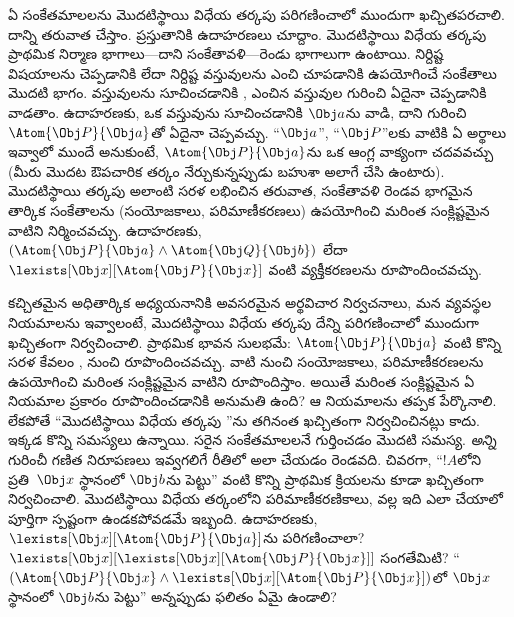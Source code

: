 \documentclass[../../../include/open-logic-section]{subfiles}
\begin{document}


ఏ సంకేతమాలలను మొదటిస్థాయి విధేయ తర్కపు  పరిగణించాలో ముందుగా
ఖచ్చితపరచాలి. దాన్ని తరువాత చేస్తాం. ప్రస్తుతానికి ఉదాహరణలు చూద్దాం. మొదటిస్థాయి విధేయ తర్కపు ప్రాథమిక నిర్మాణ భాగాలు---దాని
సంకేతావళి---రెండు భాగాలుగా ఉంటాయి. నిర్దిష్ట విషయాలను
చెప్పడానికి లేదా నిర్దిష్ట వస్తువులను ఎంచి చూపడానికి ఉపయోగించే
సంకేతాలు మొదటి భాగం. వస్తువులను సూచించడానికి ,
ఎంచిన వస్తువుల గురించి ఏదైనా చెప్పడానికి  వాడతాం.
ఉదాహరణకు, ఒక వస్తువును సూచించడానికి $\Obj a$ను 
వాడి, దాని గురించి
~$\Atom{\Obj P}{\Obj a}$తో ఏదైనా చెప్పవచ్చు. ``$\Obj
a$'', ``$\Obj P$''లకు వాటికి ఏ అర్థాలు ఇవ్వాలో ముందే అనుకుంటే,
$\Atom{\Obj P}{\Obj a}$ను ఒక ఆంగ్ల వాక్యంగా చదవవచ్చు (మీరు మొదట
ఔపచారిక తర్కం నేర్చుకున్నప్పుడు బహుశా అలాగే చేసి ఉంటారు). మొదటిస్థాయి
తర్కపు అలాంటి సరళ  లభించిన తరువాత, సంకేతావళి రెండవ
భాగమైన తార్కిక సంకేతాలను (సంయోజకాలు, పరిమాణీకరణలు) ఉపయోగించి
మరింత సంక్లిష్టమైన వాటిని నిర్మించవచ్చు. ఉదాహరణకు,
$(\Atom{\Obj P}{\Obj a} \land \Atom{\Obj Q}{\Obj b})$ లేదా
$\lexists[\Obj x][\Atom{\Obj P}{\Obj x}]$ వంటి వ్యక్తీకరణలను
రూపొందించవచ్చు.

కచ్చితమైన అధితార్కిక అధ్యయనానికి అవసరమైన అర్థవిచార నిర్వచనాలు,
మన  వ్యవస్థల నియమాలను ఇవ్వాలంటే, మొదటిస్థాయి విధేయ తర్కపు
 దేన్ని పరిగణించాలో ముందుగా ఖచ్చితంగా నిర్వచించాలి.
ప్రాథమిక భావన సులభమే: $\Atom{\Obj P}{\Obj a}$ వంటి కొన్ని సరళ
 కేవలం ,  నుంచి
రూపొందించవచ్చు. వాటి నుంచి సంయోజకాలు, పరిమాణీకరణలను ఉపయోగించి
మరింత సంక్లిష్టమైన వాటిని రూపొందిస్తాం. అయితే మరింత సంక్లిష్టమైన
 ఏ నియమాల ప్రకారం రూపొందించడానికి అనుమతి ఉంది?
ఆ నియమాలను తప్పక పేర్కొనాలి. లేకపోతే ``మొదటిస్థాయి విధేయ తర్కపు
''ను తగినంత ఖచ్చితంగా నిర్వచించినట్లు కాదు. ఇక్కడ కొన్ని
సమస్యలు ఉన్నాయి. సరైన సంకేతమాలలనే  గుర్తించడం మొదటి
సమస్య. \emph{అన్ని}  గురించీ గణిత నిరూపణలు ఇవ్వగలిగే
రీతిలో అలా చేయడం రెండవది. చివరగా, ``$!A$లోని ప్రతి~$\Obj x$ స్థానంలో
$\Obj b$ను పెట్టు'' వంటి  కొన్ని ప్రాథమిక
క్రియలను కూడా ఖచ్చితంగా నిర్వచించాలి. మొదటిస్థాయి విధేయ తర్కంలోని
పరిమాణీకరణికాలు,  వల్ల ఇది ఎలా చేయాలో పూర్తిగా
స్పష్టంగా ఉండకపోవడమే ఇబ్బంది. ఉదాహరణకు,
$\lexists[\Obj x][\Atom{\Obj P}{\Obj a}]$ను 
పరిగణించాలా? $\lexists[\Obj x][\lexists[\Obj x][\Atom{\Obj
P}{\Obj x}]]$ సంగతేమిటి? ``$(\Atom{\Obj P}{\Obj x} \land
\lexists[\Obj x][\Atom{\Obj P}{\Obj x}])$లో $\Obj x$ స్థానంలో
$\Obj b$ను పెట్టు'' అన్నప్పుడు ఫలితం ఏమై ఉండాలి?
\end{document}
